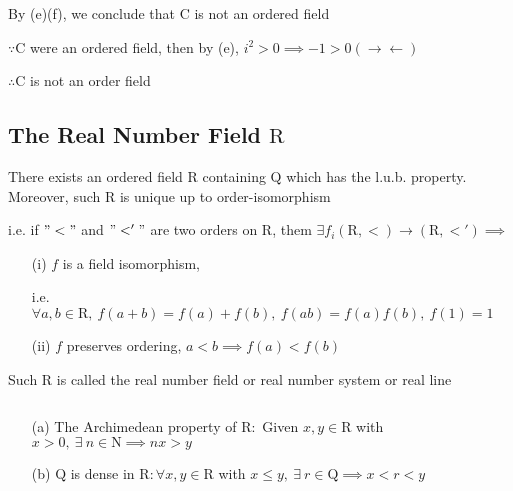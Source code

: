\begin{rmk*}
	By (e)(f), we conclude that $\mathrm{C}$ is not an ordered field
	
	$\because \mathrm{C}$ were an ordered field, then by (e), $i^2>0 \implies -1 > 0(\rightarrow\leftarrow)$
	
	$\therefore \mathrm{C}$ is not an order field
\end{rmk*}

\subsection{The Real Number Field $\mathrm{R}$}

\begin{thm*}
	There exists an ordered field $\mathrm{R}$ containing $\mathrm{Q}$ which has the l.u.b. property. Moreover, such $\mathrm{R}$ is unique up to order-isomorphism
	
	i.e. if $"<"$ and $"<'"$ are two orders on $\mathrm{R}$, them $\exists f_i(\mathrm{R},<) \rightarrow (\mathrm{R},<') \implies$
	
	\begin{enumerate}
		\item[(i)] $f$ is a field isomorphism,
		
		 i.e. $\forall a,b \in \mathrm{R},~f(a+b)=f(a)+f(b),~f(ab) = f(a)f(b),~f(1)=1$
		\item[(ii)] $f$ preserves ordering, $a<b \implies f(a) < f(b)$ 
	\end{enumerate}
	
	Such $\mathrm{R}$ is called the real number field or real number system or real line
\end{thm*}

\begin{thm*}$ $
	\begin{enumerate}
		\item[\color{red}(a)] The Archimedean  property of $\mathrm{R}:$ Given $x,y \in \mathrm{R}$ with $x>0,~\exists~n \in \mathrm{N} \implies nx>y$
		\item[(b)] $\mathrm{Q}$ is dense in $\mathrm{R}: \forall x,y\in \mathrm{R}$ with $x \leq y,~\exists ~r \in \mathrm{Q} \implies x < r < y$
	\end{enumerate}
\end{thm*}

